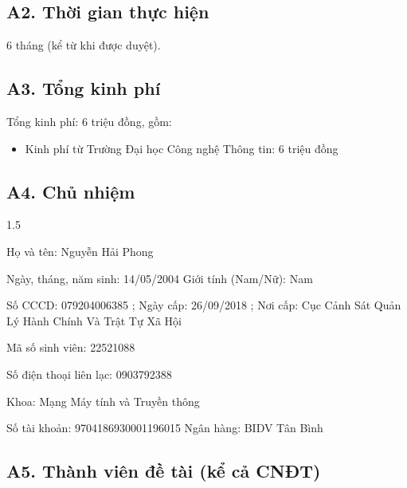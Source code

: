 \documentclass[letterpaper]{article}
\begin{document}
\subsection{A2. Thời gian thực hiện}

6 tháng (kể từ khi được duyệt).

\subsection{A3. Tổng kinh phí}

\noindent Tổng kinh phí: 6 triệu đồng, gồm:

\begin{itemize}
\item
  Kinh phí từ Trường Đại học Công nghệ Thông tin: 6 triệu
  đồng
\end{itemize}


\subsection{A4. Chủ nhiệm}
\begin{spacing}{1.5}

\indent \indent Họ và tên: Nguyễn Hải Phong \par

Ngày, tháng, năm sinh: 14/05/2004  \hspace{2cm} Giới tính (Nam/Nữ): Nam\par

Số CCCD: 079204006385 \hspace{3cm}; Ngày cấp: 26/09/2018 \hspace{3cm}; Nơi cấp: Cục Cảnh Sát Quản Lý Hành Chính Và Trật Tự Xã Hội

Mã số sinh viên:  22521088

Số điện thoại liên lạc: 0903792388

Khoa:  Mạng Máy tính và Truyền thông

Số tài khoản: 9704186930001196015 \hspace{4cm} Ngân hàng: BIDV Tân Bình
\end{spacing}

\subsection{A5. Thành viên đề tài (kể cả CNĐT)}
\end{document}
